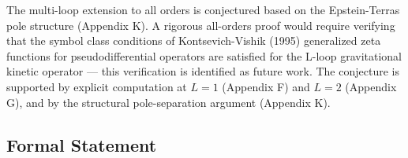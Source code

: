 \documentclass[aps,prd,preprint,superscriptaddress,longbibliography,floatfix]{revtex4-2}
\theoremstyle{remark}
\begin{document}
The multi-loop extension to all orders is conjectured based on the Epstein-Terras pole structure (Appendix K). A rigorous all-orders proof would require verifying that the symbol class conditions of Kontsevich-Vishik (1995) generalized zeta functions for pseudodifferential operators are satisfied for the L-loop gravitational kinetic operator --- this verification is identified as future work. The conjecture is supported by explicit computation at $L = 1$ (Appendix F) and $L = 2$ (Appendix G), and by the structural pole-separation argument (Appendix K).



\subsection{Formal Statement}
\end{document}
